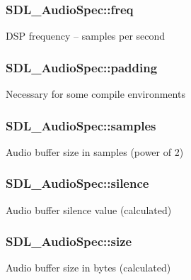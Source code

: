 \subsubsection[{\texorpdfstring{freq}{freq}}]{ S\+D\+L\+\_\+\+Audio\+Spec\+::freq}\hypertarget{struct_s_d_l___audio_spec_a8b823ce46fc2e448cf7e6fc141aff6b2}{}\label{struct_s_d_l___audio_spec_a8b823ce46fc2e448cf7e6fc141aff6b2}
D\+SP frequency -- samples per second 
\subsubsection[{\texorpdfstring{padding}{padding}}]{ S\+D\+L\+\_\+\+Audio\+Spec\+::padding}\hypertarget{struct_s_d_l___audio_spec_a738371fc13b54cefef4db16994abeeb6}{}\label{struct_s_d_l___audio_spec_a738371fc13b54cefef4db16994abeeb6}
Necessary for some compile environments 
\subsubsection[{\texorpdfstring{samples}{samples}}]{ S\+D\+L\+\_\+\+Audio\+Spec\+::samples}\hypertarget{struct_s_d_l___audio_spec_a2cdf5e885808c10bfa2810b706e69f95}{}\label{struct_s_d_l___audio_spec_a2cdf5e885808c10bfa2810b706e69f95}
Audio buffer size in samples (power of 2) 
\subsubsection[{\texorpdfstring{silence}{silence}}]{ S\+D\+L\+\_\+\+Audio\+Spec\+::silence}\hypertarget{struct_s_d_l___audio_spec_addc462c8a806e6c122eccf63482048f6}{}\label{struct_s_d_l___audio_spec_addc462c8a806e6c122eccf63482048f6}
Audio buffer silence value (calculated) 
\subsubsection[{\texorpdfstring{size}{size}}]{ S\+D\+L\+\_\+\+Audio\+Spec\+::size}\hypertarget{struct_s_d_l___audio_spec_a154cf44743ecec78c36dc6c827dd2fdb}{}\label{struct_s_d_l___audio_spec_a154cf44743ecec78c36dc6c827dd2fdb}
Audio buffer size in bytes (calculated) 
